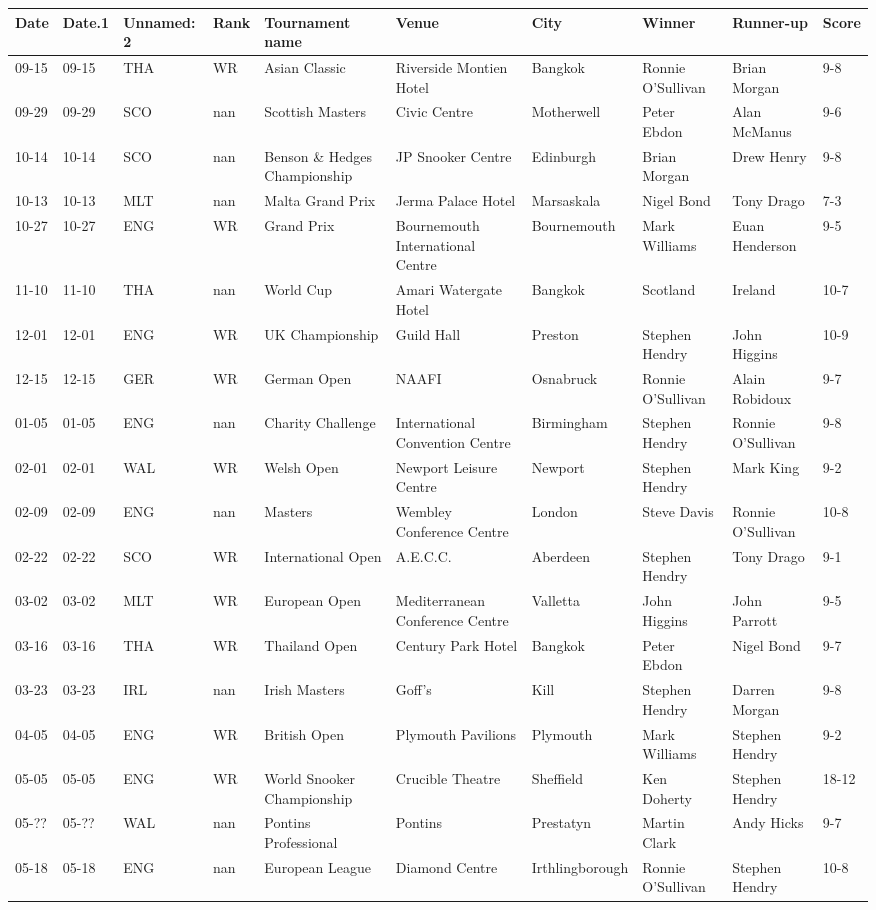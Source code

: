 \documentclass{article}
\begin{document}
\begin{tabular}{llllllllll}
\toprule
Date & Date.1 & Unnamed: 2 & Rank & Tournament name & Venue & City & Winner & Runner-up & Score \\
\midrule
09-15 & 09-15 & THA & WR & Asian Classic & Riverside Montien Hotel & Bangkok & Ronnie O'Sullivan & Brian Morgan & 9-8 \\
09-29 & 09-29 & SCO & nan & Scottish Masters & Civic Centre & Motherwell & Peter Ebdon & Alan McManus & 9-6 \\
10-14 & 10-14 & SCO & nan & Benson \& Hedges Championship & JP Snooker Centre & Edinburgh & Brian Morgan & Drew Henry & 9-8 \\
10-13 & 10-13 & MLT & nan & Malta Grand Prix & Jerma Palace Hotel & Marsaskala & Nigel Bond & Tony Drago & 7-3 \\
10-27 & 10-27 & ENG & WR & Grand Prix & Bournemouth International Centre & Bournemouth & Mark Williams & Euan Henderson & 9-5 \\
11-10 & 11-10 & THA & nan & World Cup & Amari Watergate Hotel & Bangkok & Scotland & Ireland & 10-7 \\
12-01 & 12-01 & ENG & WR & UK Championship & Guild Hall & Preston & Stephen Hendry & John Higgins & 10-9 \\
12-15 & 12-15 & GER & WR & German Open & NAAFI & Osnabruck & Ronnie O'Sullivan & Alain Robidoux & 9-7 \\
01-05 & 01-05 & ENG & nan & Charity Challenge & International Convention Centre & Birmingham & Stephen Hendry & Ronnie O'Sullivan & 9-8 \\
02-01 & 02-01 & WAL & WR & Welsh Open & Newport Leisure Centre & Newport & Stephen Hendry & Mark King & 9-2 \\
02-09 & 02-09 & ENG & nan & Masters & Wembley Conference Centre & London & Steve Davis & Ronnie O'Sullivan & 10-8 \\
02-22 & 02-22 & SCO & WR & International Open & A.E.C.C. & Aberdeen & Stephen Hendry & Tony Drago & 9-1 \\
03-02 & 03-02 & MLT & WR & European Open & Mediterranean Conference Centre & Valletta & John Higgins & John Parrott & 9-5 \\
03-16 & 03-16 & THA & WR & Thailand Open & Century Park Hotel & Bangkok & Peter Ebdon & Nigel Bond & 9-7 \\
03-23 & 03-23 & IRL & nan & Irish Masters & Goff's & Kill & Stephen Hendry & Darren Morgan & 9-8 \\
04-05 & 04-05 & ENG & WR & British Open & Plymouth Pavilions & Plymouth & Mark Williams & Stephen Hendry & 9-2 \\
05-05 & 05-05 & ENG & WR & World Snooker Championship & Crucible Theatre & Sheffield & Ken Doherty & Stephen Hendry & 18-12 \\
05-?? & 05-?? & WAL & nan & Pontins Professional & Pontins & Prestatyn & Martin Clark & Andy Hicks & 9-7 \\
05-18 & 05-18 & ENG & nan & European League & Diamond Centre & Irthlingborough & Ronnie O'Sullivan & Stephen Hendry & 10-8 \\
\bottomrule
\end{tabular}
\end{document}
